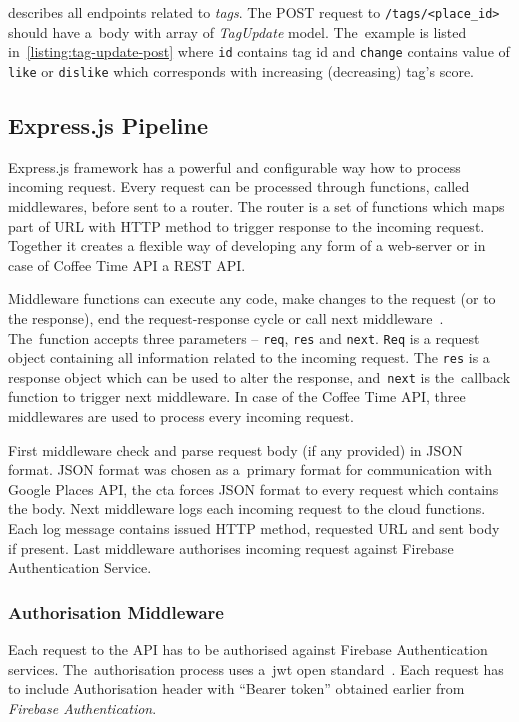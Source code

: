  describes all endpoints related to \textit{tags}. The POST request to \verb|/tags/<place_id>| should have a~body with array of \textit{TagUpdate} model. The~example is listed in~\cref{listing:tag-update-post} where \verb|id| contains tag id and \verb|change| contains value of \verb|like| or \verb|dislike| which corresponds with increasing (decreasing) tag's score. 
\subsection{Express.js Pipeline}
Express.js framework has a powerful and configurable way how to process incoming request. Every request can be processed through functions, called middlewares, before sent to a router. The router is a set of functions which maps part of URL with HTTP method to trigger response to the incoming request. Together it creates a flexible way of developing any form of a web-server or in case of Coffee Time API a REST API. 

Middleware functions can execute any code, make changes to the request (or to the response), end the request-response cycle or call next middleware~\cite{express-js-middleware}. The~function accepts three parameters -- \verb|req|, \verb|res| and \verb|next|. \verb|Req| is a request object containing all information related to the incoming request. The \verb|res| is a response object which can be used to alter the response, and~\verb|next| is the~callback function to trigger next middleware. In case of the Coffee Time API, three middlewares are used to process every incoming request.

First middleware check and parse request body (if any provided) in JSON format. JSON format was chosen as a~primary format for communication with Google Places API, the \gls{cta} forces JSON format to every request which contains the body. Next middleware logs each incoming request to the cloud functions. Each log message contains issued HTTP method, requested URL and sent body if present. Last middleware authorises incoming request against Firebase Authentication Service.

\subsubsection{Authorisation Middleware}
Each request to the API has to be authorised against Firebase Authentication services. The~authorisation process uses a~\gls{jwt} open standard~\cite{jwt-intro}. Each request has to include Authorisation header with ``Bearer token'' obtained earlier from \textit{Firebase Authentication}. 

